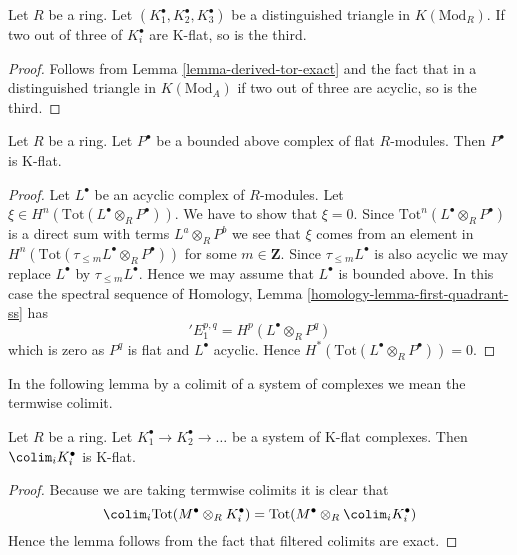 \begin{lemma}
\label{lemma-K-flat-two-out-of-three}
Let $R$ be a ring. Let $(K_1^\bullet, K_2^\bullet, K_3^\bullet)$ be
a distinguished triangle in $K(\text{Mod}_R)$. If two out of three
of $K_i^\bullet$ are K-flat, so is the third.
\end{lemma}

\begin{proof}
Follows from
Lemma \ref{lemma-derived-tor-exact}
and the fact that in a distinguished triangle in
$K(\text{Mod}_A)$ if two out of three are acyclic, so is the third.
\end{proof}

\begin{lemma}
\label{lemma-derived-tor-quasi-isomorphism}
Let $R$ be a ring. Let $P^\bullet$ be a bounded above complex of
flat $R$-modules. Then $P^\bullet$ is K-flat.
\end{lemma}

\begin{proof}
Let $L^\bullet$ be an acyclic complex of $R$-modules.
Let $\xi \in H^n(\text{Tot}(L^\bullet \otimes_R P^\bullet))$.
We have to show that $\xi = 0$.
Since $\text{Tot}^n(L^\bullet \otimes_R P^\bullet)$ is a direct
sum with terms $L^a \otimes_R P^b$ we see that $\xi$ comes from
an element in $H^n(\text{Tot}(\tau_{\leq m}L^\bullet \otimes_R P^\bullet))$
for some $m \in \mathbf{Z}$. Since $\tau_{\leq m}L^\bullet$ is also
acyclic we may replace $L^\bullet$ by $\tau_{\leq m}L^\bullet$.
Hence we may assume that $L^\bullet$ is bounded above.
In this case the spectral sequence of
Homology, Lemma \ref{homology-lemma-first-quadrant-ss}
has
$$
{}'E_1^{p, q} = H^p(L^\bullet \otimes_R P^q)
$$
which is zero as $P^q$ is flat and $L^\bullet$ acyclic. Hence
$H^*(\text{Tot}(L^\bullet \otimes_R P^\bullet)) = 0$.
\end{proof}

\noindent
In the following lemma by a colimit of a system of complexes we mean
the termwise colimit.

\begin{lemma}
\label{lemma-colimit-K-flat}
Let $R$ be a ring.
Let $K_1^\bullet \to K_2^\bullet \to \ldots$
be a system of K-flat complexes.
Then $\colim_i K_i^\bullet$ is K-flat.
\end{lemma}

\begin{proof}
Because we are taking termwise colimits it is clear that
$$
\colim_i \text{Tot}(M^\bullet \otimes_R K_i^\bullet)
=
\text{Tot}(M^\bullet \otimes_R \colim_i K_i^\bullet)
$$
Hence the lemma follows from the fact that filtered colimits are
exact.
\end{proof}

